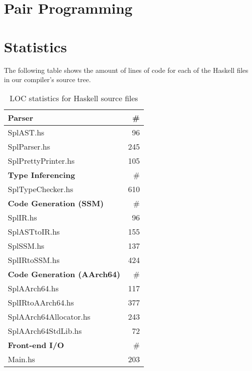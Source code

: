\section{Pair Programming}



\section{Statistics}

The following table shows the amount of lines of code for each of the Haskell files in our compiler's source tree.

\begin{table}[ht!]
	\centering
	\begin{tabular}{|l|r|}
		\hline
		\textbf{Parser} 	& \# \\
		\hline
		SplAST.hs 			& 96 \\
		SplParser.hs 		& 245 \\
		SplPrettyPrinter.hs & 105 \\

		\hline
		\textbf{Type Inferencing} & \# \\
		\hline
		SplTypeChecker.hs 	& 610 \\

		\hline
		\textbf{Code Generation (SSM)} & \# \\
		\hline
		SplIR.hs 			& 96 \\
		SplASTtoIR.hs 		& 155 \\
		SplSSM.hs 			& 137 \\
		SplIRtoSSM.hs 		& 424 \\

		\hline
		\textbf{Code Generation (AArch64)} & \# \\
		\hline
		SplAArch64.hs 		& 117 \\
		SplIRtoAArch64.hs 	& 377 \\
		SplAArch64Allocator.hs & 243 \\
		SplAArch64StdLib.hs & 72 \\

		\hline
		\textbf{Front-end I/O} & \# \\
		\hline
		Main.hs 			& 203 \\
		\hline
	\end{tabular}
	\caption{LOC statistics for Haskell source files}
\end{table}
